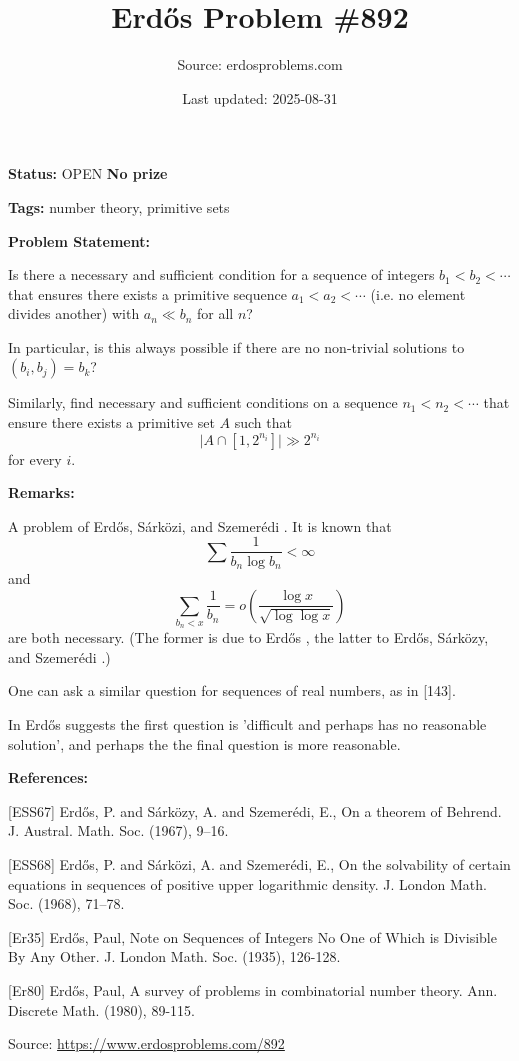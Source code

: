 \documentclass{article}
\title{Erd\H{o}s Problem \#892}
\date{Last updated: 2025-08-31}
\author{Source: erdosproblems.com}
\begin{document}
\maketitle

\noindent\textbf{Status:} OPEN \quad \textbf{No prize}

\noindent\textbf{Tags:} number theory, primitive sets

\medskip
\noindent\textbf{Problem Statement:}

Is there a necessary and sufficient condition for a sequence of integers $b_1<b_2<\cdots$ that ensures there exists a primitive sequence $a_1<a_2<\cdots$ (i.e. no element divides another) with $a_n \ll b_n$ for all $n$?

In particular, is this always possible if there are no non-trivial solutions to $(b_i,b_j)=b_k$?

Similarly, find necessary and sufficient conditions on a sequence $n_1<n_2<\cdots$ that ensure there exists a primitive set $A$ such that\[\lvert A\cap [1,2^{n_i}]\rvert \gg 2^{n_i}\]for every $i$.

\bigskip
\noindent\textbf{Remarks:}

A problem of Erd\H{o}s, S\'{a}rk\"{o}zi, and Szemer\'{e}di \cite{ESS68}. It is known that\[\sum \frac{1}{b_n\log b_n}<\infty\]and\[\sum_{b_n<x}\frac{1}{b_n} =o\left(\frac{\log x}{\sqrt{\log\log x}}\right)\]are both necessary. (The former is due to Erd\H{o}s \cite{Er35}, the latter to Erd\H{o}s, S\'{a}rk\"{o}zy, and Szemer\'{e}di \cite{ESS67}.)

One can ask a similar question for sequences of real numbers, as in [143].

In \cite{Er80} Erd\H{o}s suggests the first question is 'difficult and perhaps has no reasonable solution', and perhaps the the final question is more reasonable.

\bigskip
\noindent\textbf{References:}

[ESS67] Erd\H{o}s, P. and S\'{a}rk\"ozy, A. and Szemer\'{e}di, E., On a theorem of Behrend. J. Austral. Math. Soc. (1967), 9--16.
 
 [ESS68] Erd\H{o}s, P. and S\'{a}rk\"ozi, A. and Szemer\'{e}di, E., On the solvability of certain equations in sequences of
positive upper logarithmic density. J. London Math. Soc. (1968), 71--78.
 
 [Er35] Erd\H{o}s, Paul, Note on Sequences of Integers No One of Which is Divisible By Any Other. J. London Math. Soc. (1935), 126-128.
 
 [Er80] Erd\H{o}s, Paul, A survey of problems in combinatorial number theory. Ann. Discrete Math. (1980), 89-115.

\bigskip
\noindent\small{Source: \url{https://www.erdosproblems.com/892}}
\end{document}
